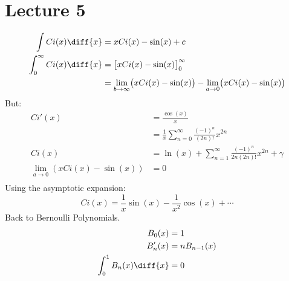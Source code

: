     \section{Lecture 5}
        \begin{align}
            \int{Ci(x)}\diff{x}&=xCi(x)-\sin(x)+c\\
            \int_{0}^{\infty}Ci(x)\diff{x}
            &=\big[xCi(x)-\sin(x)\big]_{0}^{\infty}\\
            &=\underset{b\rightarrow\infty}{\lim}
                \big(xCi(x)-\sin(x)\big)-
                \underset{a\rightarrow{0}}{\lim}
                \big(xCi(x)-\sin(x)\big)
        \end{align}
        But:
        \begin{align}
            Ci'(x)&=\frac{\cos(x)}{x}\\
                &=\frac{1}{x}\sum_{n=0}^{\infty}
                \frac{(-1)^{n}}{(2n)!}x^{2n}\\
            Ci(x)&=\ln(x)+\sum_{n=1}^{\infty}
            \frac{(-1)^{n}}{2n(2n)!}x^{2n}+\gamma\\
            \underset{a\rightarrow{0}}{\lim}(xCi(x)-\sin(x))&=0\\
        \end{align}
        Using the asymptotic expansion:
        \begin{equation}
            Ci(x)=\frac{1}{x}\sin(x)-\frac{1}{x^{2}}\cos(x)+\cdots
        \end{equation}
        Back to Bernoulli Polynomials.
        \begin{align}
            B_{0}(x)&=1\\
            B_{n}'(x)&=nB_{n-1}(x)\\
            \int_{0}^{1}B_{n}(x)\diff{x}&=0
        \end{align}
